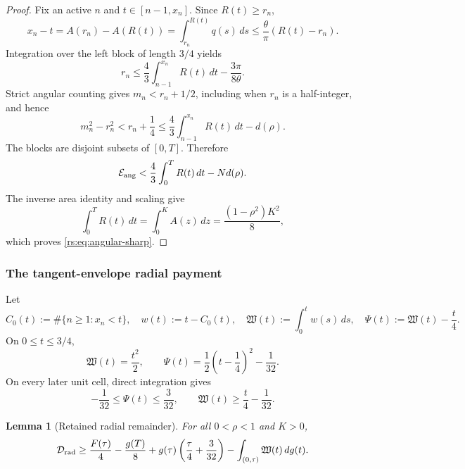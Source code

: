 \documentclass[11pt]{article}
\newtheorem{lemma}[theorem]{Lemma}
\theoremstyle{remark}
\begin{document}
\begin{proof}
Fix an active $n$ and $t\in[n-1,x_n]$.  Since $R(t)\geq r_n$,
\[
 x_n-t=A(r_n)-A(R(t))
 =\int_{r_n}^{R(t)}q(s)\,ds
 \leq\frac{\theta}{\pi}(R(t)-r_n).
\]
Integration over the left block of length $3/4$ yields
\begin{equation}
 r_n\leq\frac43\int_{n-1}^{x_n}R(t)\,dt
       -\frac{3\pi}{8\theta}.
 \label{rs:eq:rn-block}
\end{equation}
Strict angular counting gives $m_n<r_n+1/2$, including when $r_n$ is a
half-integer, and hence
\begin{equation}
 m_n^2-r_n^2<r_n+\frac14
 \leq\frac43\int_{n-1}^{x_n}R(t)\,dt-d(\rho).
 \label{rs:eq:one-angular-block}
\end{equation}
The blocks are disjoint subsets of $[0,T]$.  Therefore
\[
 \mathcal E_{\rm ang}
 <\frac43\int_0^TR(t)\,dt-Nd(\rho).
\]
The inverse area identity and scaling give
\[
 \int_0^TR(t)\,dt=\int_0^KA(z)\,dz
 =\frac{(1-\rho^2)K^2}{8},
\]
which proves \eqref{rs:eq:angular-sharp}.
\end{proof}

\subsubsection*{The tangent-envelope radial payment}

Let
\begin{equation}
 C_0(t):=\#\{n\geq1:x_n<t\},
 \quad w(t):=t-C_0(t),
 \quad \mathfrak W(t):=\int_0^tw(s)\,ds,
 \quad \Psi(t):=\mathfrak W(t)-\frac t4.
 \label{rs:eq:sawtooth}
\end{equation}
On $0\leq t\leq3/4$,
\begin{equation}
 \mathfrak W(t)=\frac{t^2}{2},
 \qquad
 \Psi(t)=\frac12\left(t-\frac14\right)^2-\frac1{32}.
 \label{rs:eq:first-cell}
\end{equation}
On every later unit cell, direct integration gives
\begin{equation}
 -\frac1{32}\leq\Psi(t)\leq\frac3{32},
 \qquad
 \mathfrak W(t)\geq\frac t4-\frac1{32}.
 \label{rs:eq:sawtooth-bounds}
\end{equation}

\begin{lemma}[Retained radial remainder]
\label{rs:lem:retained}
For all $0<\rho<1$ and $K>0$,
\begin{equation}
 \mathcal D_{\rm rad}
 \geq\frac{F(\tau)}4-\frac{g(T)}8
 +g(\tau)\left(\frac\tau4+\frac3{32}\right)
 -\int_{(0,\tau)}\mathfrak W(t)\,dg(t).
 \label{rs:eq:retained-radial}
\end{equation}
\end{lemma}
\end{document}
